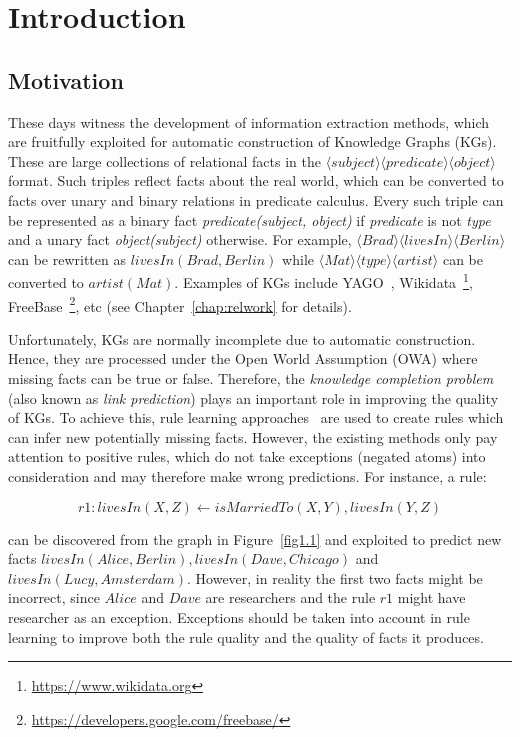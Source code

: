 \chapter{Introduction}
\label{chap:intro}

\section{Motivation}
\label{chap:motivation}

These days witness the development of information extraction methods, which are fruitfully exploited for automatic construction of Knowledge Graphs (KGs). These are large collections of relational facts in the $\langle subject \rangle \langle predicate \rangle \langle object \rangle$ format. Such triples reflect facts about the real world, which can be converted to facts over unary and binary relations in predicate calculus. Every such triple can be represented as a binary fact \textit{predicate(subject, object)} if \textit{predicate} is not \textit{type} and a unary fact \textit{object(subject)} otherwise. For example, $\langle Brad \rangle \langle livesIn \rangle \langle Berlin \rangle$ can be rewritten as $livesIn(Brad, Berlin)$ while $\langle Mat \rangle \langle type \rangle \langle artist \rangle$ can be converted to $artist(Mat)$. Examples of KGs include YAGO~\cite{ref28}, Wikidata~\footnote{\url{https://www.wikidata.org}}, FreeBase~\footnote{\url{https://developers.google.com/freebase/}}, etc (see Chapter~\ref{chap:relwork} for details).

Unfortunately, KGs are normally incomplete due to automatic construction. Hence, they are processed under the Open World Assumption (OWA) where missing facts can be true or false. Therefore, the \textit{knowledge completion problem} (also known as \textit{link prediction}) plays an important role in improving the quality of KGs. To achieve this, rule learning approaches~\cite{ref39, ref10} are used to create rules which can infer new potentially missing facts. However, the existing methods only pay attention to positive rules, which do not take exceptions (negated atoms) into consideration and may therefore make wrong predictions. For instance, a rule:

\begin{equation}
r1: livesIn(X,Z) \leftarrow isMarriedTo(X,Y), livesIn(Y,Z)
\end{equation}
\label{rule1}

can be discovered from the graph in Figure~\ref{fig1.1} and exploited to predict new facts $livesIn(Alice, Berlin), livesIn(Dave, Chicago)$ and $livesIn(Lucy, Amsterdam)$. However, in reality the first two facts might be incorrect, since $Alice$ and $Dave$ are researchers and the rule $r1$ might have researcher as an exception. Exceptions should be taken into account in rule learning to improve both the rule quality and the quality of facts it produces.

